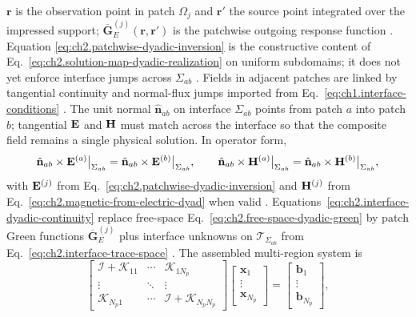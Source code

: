 $\mathbf{r}$ is the observation point in patch $\Omega_j$ and $\mathbf{r}'$ the source point
integrated over the impressed support; $\overline{\mathbf{G}}_{E}^{(j)}(\mathbf{r},\mathbf{r}')$
is the patchwise outgoing response function \cite{stratton1941}. Equation
\eqref{eq:ch2.patchwise-dyadic-inversion} is the constructive content of
Eq.~\eqref{eq:ch2.solution-map-dyadic-realization} on uniform subdomains; it does
not yet enforce interface jumps across \(\Sigma_{ab}\) \cite{stratton1941}.
Fields in adjacent patches are linked by tangential continuity and normal-flux jumps
imported from Eq.~\eqref{eq:ch1.interface-conditions} \cite{stratton1941}.
The unit normal \(\hat{\mathbf{n}}_{ab}\) on interface \(\Sigma_{ab}\) points from patch
\(a\) into patch \(b\); tangential \(\mathbf{E}\) and \(\mathbf{H}\) must match across the interface so
that the composite field remains a single physical solution.
In
operator form,
\begin{equation}
\label{eq:ch2.interface-dyadic-continuity}
\hat{\mathbf{n}}_{ab}\times\mathbf{E}^{(a)}\big|_{\Sigma_{ab}}
=
\hat{\mathbf{n}}_{ab}\times\mathbf{E}^{(b)}\big|_{\Sigma_{ab}},
\qquad
\hat{\mathbf{n}}_{ab}\times\mathbf{H}^{(a)}\big|_{\Sigma_{ab}}
=
\hat{\mathbf{n}}_{ab}\times\mathbf{H}^{(b)}\big|_{\Sigma_{ab}},
\end{equation}
with \(\mathbf{E}^{(j)}\) from Eq.~\eqref{eq:ch2.patchwise-dyadic-inversion} and
\(\mathbf{H}^{(j)}\) from Eq.~\eqref{eq:ch2.magnetic-from-electric-dyad} when valid
\cite{harrington2001}. Equations~\eqref{eq:ch2.interface-dyadic-continuity} replace
free-space Eq.~\eqref{eq:ch2.free-space-dyadic-green} by patch Green functions
\(\overline{\mathbf{G}}_{E}^{(j)}\) plus interface unknowns on
\(\mathcal{T}_{\Sigma_{ab}}\) from Eq.~\eqref{eq:ch2.interface-trace-space}
\cite{stratton1941}. The assembled multi-region system is
\begin{equation}
\label{eq:ch2.multi-region-inversion-system}
\begin{bmatrix}
\mathcal{I}+\mathcal{K}_{11} & \cdots & \mathcal{K}_{1N_p}\\
\vdots & \ddots & \vdots\\
\mathcal{K}_{N_p1} & \cdots & \mathcal{I}+\mathcal{K}_{N_pN_p}
\end{bmatrix}
\begin{bmatrix}\mathbf{x}_1\\ \vdots\\ \mathbf{x}_{N_p}\end{bmatrix}
=
\begin{bmatrix}\mathbf{b}_1\\ \vdots\\ \mathbf{b}_{N_p}\end{bmatrix},
\end{equation}
